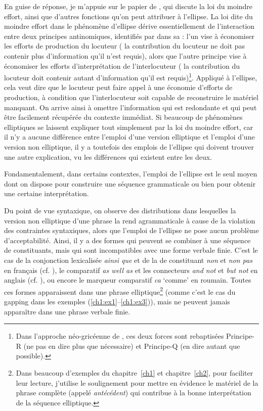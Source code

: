 En guise de réponse, je m’appuie sur le papier de \citet{HendriksEtAl2005}, qui discute la loi du moindre effort, ainsi que d’autres fonctions qu’on peut attribuer à l’ellipse. La loi dite du moindre effort dans le phénomène d’ellipse dérive essentiellement de l’interaction entre deux principes antinomiques, identifiés par \citet{Grice1968} dans sa  : l’un vise à économiser les efforts de production du locuteur ({\cad} la contribution du locuteur ne doit pas contenir plus d’information qu’il n’est requis), alors que l’autre principe vise à économiser les efforts d’interprétation de l’interlocuteur ({\cad} la contribution du locuteur doit contenir autant d’information qu’il est requis)\footnote{Dans l’approche néo-gricéenne de \citet{Horn1993}, ces deux forces sont rebaptisées Principe-R (ne pas en dire plus que nécessaire) et Principe-Q (en dire autant que possible).}. Appliqué à l’ellipse, cela veut dire que le locuteur peut faire appel à une économie d’efforts de production, à condition que l’interlocuteur soit capable de reconstruire le matériel manquant. On arrive ainsi à omettre l’information qui est redondante et qui peut être facilement récupérée du contexte immédiat. Si beaucoup de phénomènes elliptiques se laissent expliquer tout simplement par la loi du moindre effort, car il n’y a aucune différence entre l’emploi d’une version elliptique et l’emploi d’une version non elliptique, il y a toutefois des emplois de l’ellipse qui doivent trouver une autre explication, vu les différences qui existent entre les deux. 

Fondamentalement, dans certains contextes, l’emploi de l’ellipse est le seul moyen dont on dispose pour construire une séquence grammaticale ou bien pour obtenir une certaine interprétation. 

Du point de vue syntaxique, on observe des distributions dans lesquelles la version non elliptique d’une phrase la rend agrammaticale à cause de la violation des contraintes syntaxiques, alors que l’emploi de l’ellipse ne pose aucun problème d’acceptabilité. Ainsi, il y a des formes qui peuvent se combiner à une séquence de constituants, mais qui sont incompatibles avec une forme verbale finie. C’est le cas de la conjonction lexicalisée \textit{ainsi que}  et de la  de constituant \textit{non} et \textit{non pas}  en français (cf. \citealt{AbeilleEtAl1996,Mouret2007}), le comparatif \textit{as well as}  et les connecteurs \textit{and not}  et \textit{but not}  en anglais (cf. \citealt{CulicoverEtAl2005}), ou encore le marqueur comparatif \textit{ca} ‘comme’  en roumain. Toutes ces formes apparaissent dans une phrase elliptique\footnote{Dans beaucoup d'exemples du chapitre~\ref{ch1} et chapitre~\ref{ch2}, pour faciliter leur lecture, j'utilise le soulignement pour mettre en évidence le matériel de la phrase complète (appelé \textit{antécédent}) qui contribue à la bonne interprétation de la séquence elliptique.} (comme c’est le cas du gapping dans les exemples (\ref{ch1:ex1}--\ref{ch1:ex3})), mais ne peuvent jamais apparaître dans une phrase verbale finie.  

